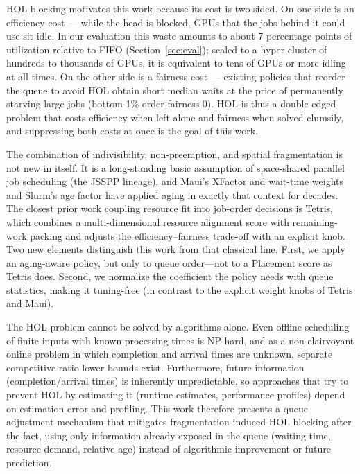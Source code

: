\documentclass{ieeetj}
\begin{document}
HOL blocking motivates this work because its cost is two-sided. On one side is an efficiency cost --- while the head is blocked, GPUs that the jobs behind it could use sit idle. In our evaluation this waste amounts to about 7 percentage points of utilization relative to FIFO (Section~\ref{sec:eval}); scaled to a hyper-cluster of hundreds to thousands of GPUs, it is equivalent to tens of GPUs or more idling at all times. On the other side is a fairness cost --- existing policies that reorder the queue to avoid HOL obtain short median waits at the price of permanently starving large jobs (bottom-1\% order fairness 0). HOL is thus a double-edged problem that costs efficiency when left alone and fairness when solved clumsily, and suppressing both costs at once is the goal of this work.

The combination of indivisibility, non-preemption, and spatial fragmentation is not new in itself. It is a long-standing basic assumption of space-shared parallel job scheduling (the JSSPP lineage\cite{feitelson1996toward}), and Maui's XFactor and wait-time weights\cite{jackson2001maui} and Slurm's age factor have applied aging in exactly that context for decades. The closest prior work coupling resource fit into job-order decisions is Tetris\cite{grandl2014multi}, which combines a multi-dimensional resource alignment score with remaining-work packing and adjusts the efficiency--fairness trade-off with an explicit knob. Two new elements distinguish this work from that classical line. First, we apply an aging-aware policy, but only to queue order---not to a Placement score as Tetris does. Second, we normalize the coefficient the policy needs with queue statistics, making it tuning-free (in contrast to the explicit weight knobs of Tetris and Maui).

The HOL problem cannot be solved by algorithms alone. Even offline scheduling of finite inputs with known processing times is NP-hard\cite{ullman1975np}, and as a non-clairvoyant online problem in which completion and arrival times are unknown, separate competitive-ratio lower bounds exist\cite{motwani1994nonclairvoyant}. Furthermore, future information (completion/arrival times) is inherently unpredictable, so approaches that try to prevent HOL by estimating it (runtime estimates, performance profiles) depend on estimation error and profiling. This work therefore presents a queue-adjustment mechanism that mitigates fragmentation-induced HOL blocking after the fact, using only information already exposed in the queue (waiting time, resource demand, relative age) instead of algorithmic improvement or future prediction.
\end{document}
